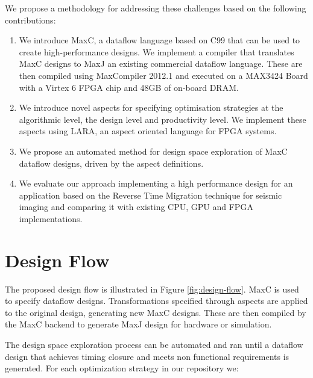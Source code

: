 We propose a methodology for addressing these challenges based on the
following contributions:
\begin{enumerate}
\item We introduce MaxC, a dataflow language based on C99 that can be
  used to create high-performance designs. We implement a compiler
  that translates MaxC designs to MaxJ an existing commercial dataflow
  language. These are then compiled using MaxCompiler 2012.1 and
  executed on a MAX3424 Board with a Virtex 6 FPGA chip and 48GB of
  on-board DRAM.
\item We introduce novel aspects for specifying optimisation
  strategies at the algorithmic level, the design level and
  productivity level. We implement these aspects using
  LARA, an aspect oriented language for FPGA systems.
\item We propose an automated method for design space exploration of
  MaxC dataflow designs, driven by the aspect definitions.
\item We evaluate our approach implementing a high performance design
  for an application based on the Reverse Time Migration technique for
  seismic imaging and comparing it with existing CPU, GPU and FPGA
  implementations.
\end{enumerate}



\section{Design Flow}

The proposed design flow is illustrated in Figure
\ref{fig:design-flow}. MaxC is used to specify dataflow
designs. Transformations specified through aspects are applied to the
original design, generating new MaxC designs. These are then compiled
by the MaxC backend to generate MaxJ design for hardware or
simulation.

The design space exploration process can be automated and ran until a
dataflow design that achieves timing closure and meets non functional
requirements is generated.  For each optimization strategy in our
repository we:

